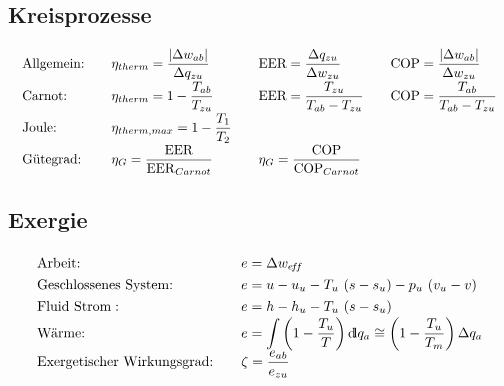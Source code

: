 \subsection{Kreisprozesse}
%
	\skipabove{-25pt}
	\[ \arraycolsep=1em \def\arraystretch{1.8}
	\begin{array}{llll}
		\text{Allgemein:} & \eta_{therm} = \dfrac{\abs{\Delta w_{ab}}} {\Delta q_{zu}} & \text{EER} = \dfrac{\Delta q_{zu}}{\Delta w_{zu}}    & \text{COP} = \dfrac{\abs{\Delta w_{ab}}}{\Delta w_{zu}} \\
		\text{Carnot:}    & \eta_{therm} = 1- \dfrac{T_{ab}}{T_{zu}}                   & \text{EER} = \dfrac{T_{zu}}{T_{ab} - T_{zu}}         & \text{COP} = \dfrac{T_{ab}}{T_{ab} - T_{zu}}            \\
		\text{Joule:}     & \eta_{therm,max} = 1 - \dfrac{T_1}{T_2}                    &                                                      &                                                         \\
		\text{Gütegrad:}  & \eta_G = \dfrac{\mathrm{EER}}{\mathrm{EER}_{Carnot}}       & \eta_G = \dfrac{\mathrm{COP}}{\mathrm{COP}_{Carnot}} &
	\end{array} \]

\subsection{Exergie}
	\skipabove{-20pt}
	\[ \arraycolsep=1em \def\arraystretch{1.3}
	\begin{array}{ll}
		\text{Arbeit:}                     & e = \Delta w_{\eff}                                                                                             \\
		\text{Geschlossenes System:}       & e = u - u_u - T_u\ (s-s_u) - p_u\ (v_u-v)                                                                       \\
		\text{Fluid Strom}:                & e = h - h_u - T_u\ (s-s_u)                                                                                      \\
		\text{Wärme:}                      & e = \mathlarger{\int} \left(1-\dfrac{T_u}{T} \right) \dd q_a  \cong \left(1-\dfrac{T_u}{T_m} \right) \Delta q_a \\
		\text{Exergetischer Wirkungsgrad:} & \zeta = \dfrac{e_{ab}}{e_{zu}}
	\end{array} \]
